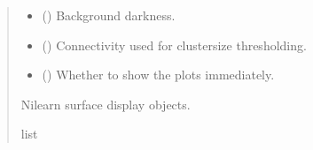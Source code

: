 \documentclass[letterpaper,10pt,english]{sphinxhowto}
\begin{document}
\begin{fulllineitems}
\begin{quote}
\begin{description}
\begin{itemize}
\item {} 
\sphinxAtStartPar
{} (\sphinxstyleliteralemphasis{\sphinxupquote{, }}) \textendash{} Background darkness.

\item {} 
\sphinxAtStartPar
{} (\sphinxstyleliteralemphasis{\sphinxupquote{, }}) \textendash{} Connectivity used for cluster\sphinxhyphen{}size thresholding.

\item {} 
\sphinxAtStartPar
{} (\sphinxstyleliteralemphasis{\sphinxupquote{, }}) \textendash{} Whether to show the plots immediately.

\end{itemize}

\sphinxAtStartPar
{} \textendash{} Nilearn surface display objects.

\sphinxAtStartPar
list

\end{description}\end{quote}

\end{fulllineitems}

\end{document}
